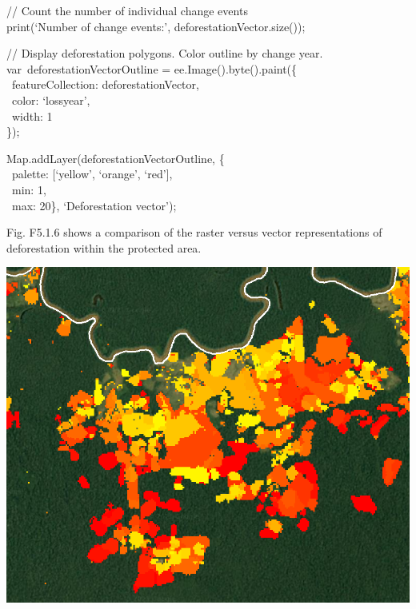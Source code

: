 \documentclass[
  letterpaper,
  DIV=11,
  numbers=noendperiod]{scrreprt}
\begin{document}
// Count the number of individual change events\\
print(`Number of change events:', deforestationVector.size());

// Display deforestation polygons. Color outline by change year.\\
var~deforestationVectorOutline = ee.Image().byte().paint(\{\\
\hspace*{0.333em} ~featureCollection: deforestationVector,\\
\hspace*{0.333em} ~color: `lossyear',\\
\hspace*{0.333em} ~width: 1\\
\});

Map.addLayer(deforestationVectorOutline, \{\\
\hspace*{0.333em} ~palette: {[}`yellow', `orange', `red'{]},\\
\hspace*{0.333em} ~min: 1,\\
\hspace*{0.333em} ~max: 20\}, `Deforestation vector');

Fig. F5.1.6 shows a comparison of the raster versus vector
representations of deforestation within the protected area.

\includegraphics{./F5/image42.png}
\end{document}
